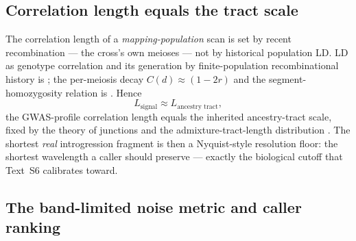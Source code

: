 \documentclass[11pt]{article}
\begin{document}
\subsection{Correlation length equals the tract scale}
\label{sec:tractscale}

The correlation length of a \emph{mapping-population} scan is set by recent
recombination --- the cross's own meioses --- not by historical population LD. LD as
genotype correlation and its generation by finite-population recombinational history
is \citet{hill_robertson_1968}; the per-meiosis decay $C(d)\approx(1-2r)$ and the
segment-homozygosity relation is \citet{sved_1971}. Hence
\begin{equation}
L_{\text{signal}} \approx L_{\text{ancestry tract}},
\label{eq:lengthscale}
\end{equation}
the GWAS-profile correlation length equals the inherited ancestry-tract scale, fixed
by the theory of junctions and the admixture-tract-length distribution
\citep{fisher_1954,stam_1980,gravel_2012,liang_nielsen_2014,pool_nielsen_2009}. The
shortest \emph{real} introgression fragment is then a Nyquist-style resolution floor:
the shortest wavelength a caller should preserve --- exactly the biological cutoff
that Text~S6 calibrates toward.

\subsection{The band-limited noise metric and caller ranking}
\label{sec:noisiness}
\end{document}
